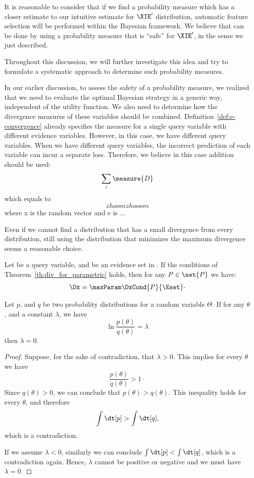 It is reasonable to consider that if we find a probability measure which has a closer estimate to our
intuitive estimate for $\XIE'$ distribution, automatic feature selection will be performed within the Bayesian
framework.
We believe that can be done by using a probability measure that is “safe” for $\XIE'$, in the sense we just described.

Throughout this discussion, we will further investigate this idea and try to formulate a systematic approach to
determine such probability measures.


In our earlier discussion, to assess the safety of a probability measure, we realized that we need to
evaluate the optimal Bayesian strategy in a generic way, independent of the utility function.
We also need to determine how the divergence measures of these variables should be combined.
Definition~\ref{def:e-convergence} already specifies the measure for a single query variable with different evidence
variables.
However, in this case, we have different query variables.
When we have different query variables, the incorrect prediction of each variable can incur a separate loss.
Therefore, we believe in this case addition should be used:
\[
    \sum_i \measure{D}
\]
which equals to
\[
    zhoom zhooom
\]
where x is the random vector and e is ...



Even if we cannot find a distribution that has a small divergence from every distribution, still using the distribution
that minimizes the maximum divergence seems a reasonable choice.


\begin{proposition}
    Let \Qvar be a query variable, and \Eset be an evidence set in \Mt.
    If the conditions of Theorem~\ref{th:div_for_parametric} holds, then for any $P \in \set{P}$ we have:
    \[
        \Dx = \maxParam \DxCond{P}{\Eset} \cdot
    \]
\end{proposition}


\begin{lemma}
    Let $p$, and $q$ be two probability distributions for a random variable $\Theta$.
    If for any $\theta$, and a constant $\lambda$, we have
    \[
        \ln \frac{p(\theta)}{q(\theta)} = \lambda
    \]
    then $\lambda = 0$.
\end{lemma}

\begin{proof}
    Suppose, for the sake of contradiction, that $\lambda > 0$.
    This implies for every $\theta$ we have
    \[
        \frac{p(\theta)}{q(\theta)} > 1 \cdot
    \]
    Since $q(\theta) > 0$, we can conclude that $p(\theta) > q(\theta)$.
    This inequality holds for every $\theta$, and therefore
    \[
        \int \dt[p] > \int \dt[q],
    \]
    which is a contradiction.

    If we assume $\lambda < 0$, similarly we can conclude $\int \dt[p] < \int \dt[q]$, which is a contradiction again.
    Hence, $\lambda$ cannot be positive or negative and we must have $\lambda = 0$.
\end{proof}

